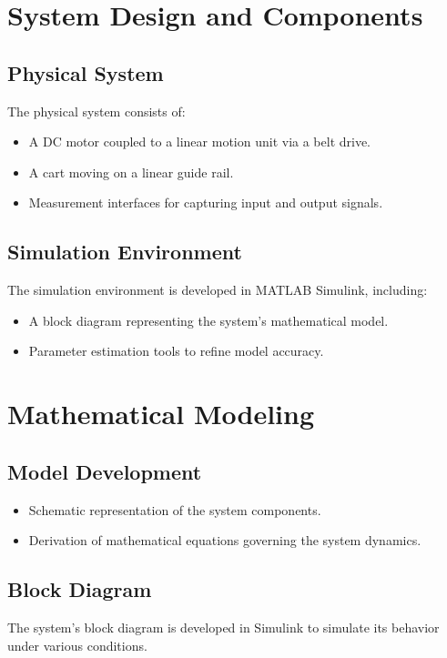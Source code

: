 \documentclass[conference]{IEEEtran}
\begin{document}
\section{System Design and Components}
\subsection{Physical System}
The physical system consists of:
\begin{itemize}
    \item A DC motor coupled to a linear motion unit via a belt drive.
    \item A cart moving on a linear guide rail.
    \item Measurement interfaces for capturing input and output signals.
\end{itemize}

\subsection{Simulation Environment}
The simulation environment is developed in MATLAB Simulink, including:
\begin{itemize}
    \item A block diagram representing the system's mathematical model.
    \item Parameter estimation tools to refine model accuracy.
\end{itemize}

\section{Mathematical Modeling}
\subsection{Model Development}
\begin{itemize}
    \item Schematic representation of the system components.
    \item Derivation of mathematical equations governing the system dynamics.
\end{itemize}

\subsection{Block Diagram}
The system's block diagram is developed in Simulink to simulate its behavior under various conditions.
\end{document}
